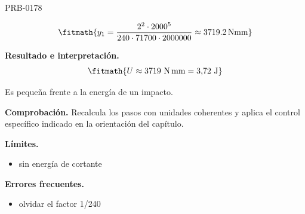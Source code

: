 \begin{studiumworked}{PRB-0178}
\begin{enumerate}
\[\fitmath{y_{1}=\frac{{2}^{2}\cdot {2000}^{5}}{240\cdot 71700\cdot 2000000}\approx 3719.2\,\mathrm{N mm}}\]

\end{enumerate}

\textbf{Resultado e interpretación.}\[\fitmath{U \approx 3719\ \mathrm{N\,mm} = 3{,}72\ \mathrm{J}}\]

Es pequeña frente a la energía de un impacto.

\par\textbf{Comprobación.} Recalcula los pasos con unidades coherentes y aplica el control específico indicado en la orientación del capítulo.

\textbf{Límites.}\begin{itemize}\item sin energía de cortante\end{itemize}

\textbf{Errores frecuentes.}\begin{itemize}\item olvidar el factor 1/240\end{itemize}

\end{studiumworked}

\Needspace{.3\textheight}


